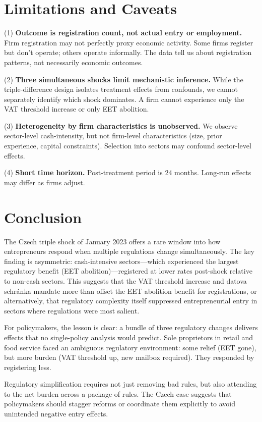 \documentclass[12pt]{article}
\begin{document}
\section{Limitations and Caveats}

(1) \textbf{Outcome is registration count, not actual entry or employment.} Firm registration may not perfectly proxy economic activity. Some firms register but don't operate; others operate informally. The data tell us about registration patterns, not necessarily economic outcomes.

(2) \textbf{Three simultaneous shocks limit mechanistic inference.} While the triple-difference design isolates treatment effects from confounds, we cannot separately identify which shock dominates. A firm cannot experience only the VAT threshold increase or only EET abolition.

(3) \textbf{Heterogeneity by firm characteristics is unobserved.} We observe sector-level cash-intensity, but not firm-level characteristics (size, prior experience, capital constraints). Selection into sectors may confound sector-level effects.

(4) \textbf{Short time horizon.} Post-treatment period is 24 months. Long-run effects may differ as firms adjust.

\section{Conclusion}

The Czech triple shock of January 2023 offers a rare window into how entrepreneurs respond when multiple regulations change simultaneously. The key finding is asymmetric: cash-intensive sectors—which experienced the largest regulatory benefit (EET abolition)—registered at lower rates post-shock relative to non-cash sectors. This suggests that the VAT threshold increase and datova schr\'{a}nka mandate more than offset the EET abolition benefit for registrations, or alternatively, that regulatory complexity itself suppressed entrepreneurial entry in sectors where regulations were most salient.

For policymakers, the lesson is clear: a bundle of three regulatory changes delivers effects that no single-policy analysis would predict. Sole proprietors in retail and food service faced an ambiguous regulatory environment: some relief (EET gone), but more burden (VAT threshold up, new mailbox required). They responded by registering less.

Regulatory simplification requires not just removing bad rules, but also attending to the net burden across a package of rules. The Czech case suggests that policymakers should stagger reforms or coordinate them explicitly to avoid unintended negative entry effects.
\end{document}
